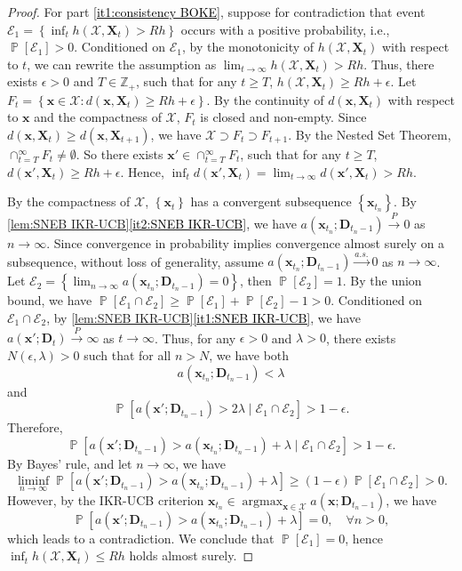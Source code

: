 \documentclass[11pt,en]{elegantpaper}
\newcommand{\domain}{\mathcal{X}}
\newcommand{\X}{\bm{X}}
\newcommand{\x}{\bm{x}}
\newcommand{\D}{\bm{D}}
\newcommand{\1}{\mathds{1}}
\newcommand{\pto}{\overset{P}{\longrightarrow}}
\newcommand{\asto}{\overset{a.s.}{\longrightarrow}}
\newcommand{\set}[1]{\left\{#1\right\}}
\DeclareMathOperator*{\Prob}{\mathbb{P}}
\DeclareMathOperator*{\argmax}{argmax}
\newcommand{\itref}[1]{\hyperref[#1]{\textcolor{black}{\ref*{#1}}}}
\begin{document}
\begin{proof}
    For part \itref{it1:consistency BOKE}, suppose for contradiction that event $\mathcal{E}_1 = \set{\inf_{t} h(\domain, \X_t) > R h}$ occurs with a positive probability, i.e., $\Prob[\mathcal{E}_1] > 0$. Conditioned on $\mathcal{E}_1$, by the monotonicity of $h(\domain, \X_t)$ with respect to $t$, we can rewrite the assumption as $\lim_{t \to \infty} h(\domain, \X_t) > Rh$. Thus, there exists $\epsilon > 0$ and $T \in \mathbb{Z}_+$, such that for any $t \ge T$, $h(\domain, \X_t) \ge Rh + \epsilon$. Let $F_t = \set{\x \in \domain : d(\x, \X_t) \ge Rh + \epsilon}$. By the continuity of $d(\x, \X_t)$ with respect to $\x$ and the compactness of $\domain$, $F_t$ is closed and non-empty. Since $d(\x, \X_t) \ge d(\x, \X_{t+1})$, we have $\domain \supset F_t \supset F_{t+1}$. By the Nested Set Theorem, $\cap_{t=T}^{\infty} F_t \neq \emptyset$. So there exists $\x' \in \cap_{t=T}^{\infty} F_t$, such that for any $t \ge T$, $d(\x', \X_t) \ge Rh + \epsilon$. Hence, $\inf_t d(\x', \X_t) = \lim_{t \to \infty} d(\x', \X_t) > Rh$.
    
    By the compactness of $\domain$, $\set{\x_t}$ has a convergent subsequence $\set{\x_{t_n}}$.
    By \cref{lem:SNEB IKR-UCB}\itref{it2:SNEB IKR-UCB}, we have $a(\x_{t_n}; \D_{t_n - 1}) \pto 0$ as $n \to \infty$. Since convergence in probability implies convergence almost surely on a subsequence, without loss of generality, assume $a(\x_{t_n}; \D_{t_n - 1}) \asto 0$ as $n \to \infty$.
    Let $\mathcal{E}_2 = \set{\lim_{n \to \infty} a(\x_{t_n}; \D_{t_n - 1}) = 0}$, then $\Prob[\mathcal{E}_2] = 1$. By the union bound, we have $\Prob[\mathcal{E}_1 \cap \mathcal{E}_2] \ge \Prob[\mathcal{E}_1] + \Prob[\mathcal{E}_2] - 1 > 0$. Conditioned on $\mathcal{E}_1 \cap \mathcal{E}_2$, by \cref{lem:SNEB IKR-UCB}\itref{it1:SNEB IKR-UCB}, we have $a(\x'; \D_t) \pto \infty$ as $t \to \infty$. Thus, for any $\epsilon > 0$ and $\lambda > 0$, there exists $N(\epsilon, \lambda) > 0$ such that for all $n > N$, we have both
    \[
        a(\x_{t_n}; \D_{t_n - 1}) < \lambda
    \]
    and
    \[
        \Prob\left[ a(\x'; \D_{t_n - 1}) > 2 \lambda \mid \mathcal{E}_1 \cap \mathcal{E}_2 \right] > 1 - \epsilon.
    \]
    Therefore,
    \[
        \Prob\left[ a(\x'; \D_{t_n - 1}) > a(\x_{t_n}; \D_{t_n - 1}) + \lambda \mid \mathcal{E}_1 \cap \mathcal{E}_2 \right] > 1 - \epsilon.
    \]
    By Bayes' rule, and let $n \to \infty$, we have
    \[
        \liminf_{n \to \infty} \Prob\left[ a(\x'; \D_{t_n - 1}) > a(\x_{t_n}; \D_{t_n - 1}) + \lambda \right] 
        \ge (1 - \epsilon) \Prob[\mathcal{E}_1 \cap \mathcal{E}_2] > 0.
    \]
    However, by the IKR-UCB criterion $\x_{t_n} \in \argmax_{\x \in \domain} a(\x; \D_{t_n - 1})$, we have
    \[
        \Prob\left[ a(\x'; \D_{t_n - 1}) > a(\x_{t_n}; \D_{t_n - 1}) + \lambda \right] = 0, \quad \forall n > 0,
    \]
    which leads to a contradiction. We conclude that $\Prob[\mathcal{E}_1] = 0$, hence $\inf_{t} h(\domain, \X_t) \le R h$ holds almost surely.
    

\end{proof}
\end{document}
